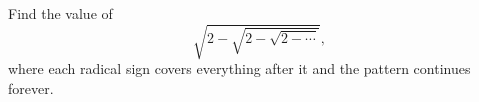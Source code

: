Find the value of
\[
\sqrt{2-\sqrt{2-\sqrt{2-\cdots}}},
\]
where each radical sign covers everything after it and the pattern continues forever.
